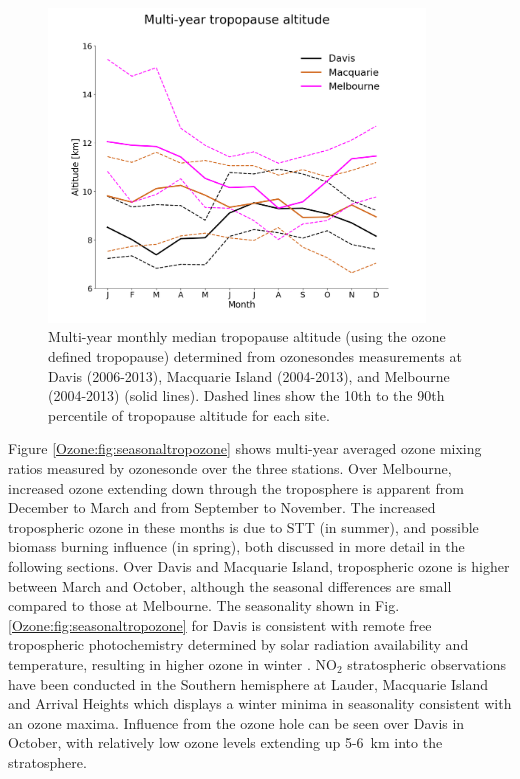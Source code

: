     \begin{figure}[t] 
      \includegraphics[width=10cm]{Figures/Ozone/tpheights.png}
      \caption{%
        Multi-year monthly median tropopause altitude (using the ozone defined tropopause) determined from ozonesondes measurements at Davis (2006-2013), Macquarie Island (2004-2013), and Melbourne (2004-2013) (solid lines).
        Dashed lines show the 10th to the 90th percentile of tropopause altitude for each site.}
      \label{Ozone:fig:seasonaltpheights}
    \end{figure}
  
    Figure \ref{Ozone:fig:seasonaltropozone} shows multi-year averaged ozone mixing ratios measured by ozonesonde over the three stations.
    Over Melbourne, increased ozone extending down through the troposphere is apparent from December to March and from September to November.
    The increased tropospheric ozone in these months is due to STT (in summer), and possible biomass burning influence (in spring), both discussed in more detail in the following sections.
    Over Davis and Macquarie Island, tropospheric ozone is higher between March and October, although the seasonal differences are small compared to those at Melbourne.
    The seasonality shown in Fig. \ref{Ozone:fig:seasonaltropozone} for Davis is consistent with remote free tropospheric photochemistry determined by solar radiation availability and temperature, resulting in higher ozone in winter \citep{Lelieveld2000}.
    NO$_2$ stratospheric observations have been conducted in the Southern hemisphere at Lauder, Macquarie Island and Arrival Heights \citep[i.e.][]{Struthers2004} which displays a winter minima in seasonality consistent with an ozone maxima.
    Influence from the ozone hole can be seen over Davis in October, with relatively low ozone levels extending up 5-6~km into the stratosphere.
    
